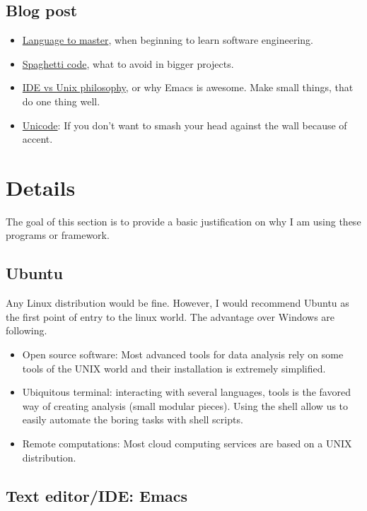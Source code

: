 \documentclass[11pt]{article}
\begin{document}
\subsection{Blog post}
\label{sec:org8605bae}
\begin{itemize}
\item \href{https://michaelochurch.wordpress.com/2012/07/27/six-languages-to-master/}{Language to master}, when beginning to learn software engineering.
\item \href{https://michaelochurch.wordpress.com/2012/08/15/what-is-spaghetti-code/}{Spaghetti code}, what to avoid in bigger projects.
\item \href{https://michaelochurch.wordpress.com/2013/01/09/ide-culture-vs-unix-philosophy/}{IDE vs Unix philosophy}, or why Emacs is awesome. Make small things, that do one thing well.
\item \href{http://www.joelonsoftware.com/articles/Unicode.html}{Unicode}: If you don't want to smash your head against the wall because of accent.
\end{itemize}

\section{Details}
\label{sec:org612103d}
The goal of this section is to provide a basic justification on why I am using
these programs or framework.

\subsection{\textbf{Ubuntu}}
\label{sec:org78b2e86}
Any Linux distribution would be fine.  However, I would recommend Ubuntu as
the first point of entry to the linux world. The advantage over Windows are
following.
\begin{itemize}
\item Open source software: Most advanced tools for data analysis rely on some
tools of the UNIX world and their installation is extremely simplified.
\item Ubiquitous terminal: interacting with several languages, tools is the
favored way of creating analysis (small modular pieces).  Using the shell
allow us to easily automate the boring tasks with shell scripts.
\item Remote computations: Most cloud computing services are based on a UNIX
distribution.
\end{itemize}

\subsection{Text editor/IDE: \textbf{Emacs}}
\label{sec:orgb956bed}
\end{document}
